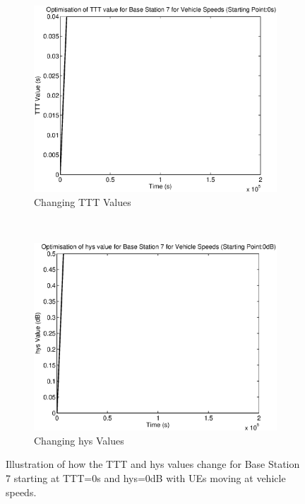\begin{figure}[H]
        \centering
        \begin{subfigure}[b]{0.49\textwidth}
                \includegraphics[width=\textwidth]{figures/graphs/vehlow/TTT7.eps}
                \caption{Changing TTT Values}
        \end{subfigure}%
        ~ %
        \begin{subfigure}[b]{0.49\textwidth}
                \includegraphics[width=\textwidth]{figures/graphs/vehlow/hys7.eps}
                \caption{Changing hys Values}
        \end{subfigure}
        \caption{Illustration of how the TTT and hys values change for Base Station 7 starting at TTT=0s and hys=0dB with UEs moving at vehicle speeds.}
\end{figure}
